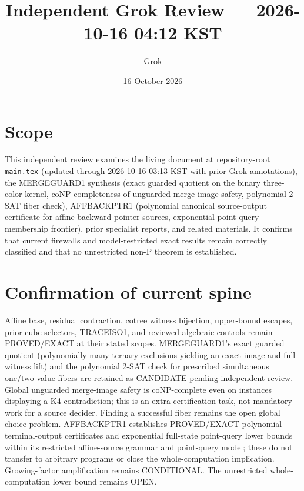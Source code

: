 \documentclass[11pt]{article}
\title{Independent Grok Review --- 2026-10-16 04:12 KST}
\author{Grok}
\date{16 October 2026}
\begin{document}
\maketitle

\begin{center}
\end{center}

\section{Scope}
This independent review examines the living document at repository-root \texttt{main.tex} (updated through 2026-10-16 03:13 KST with prior Grok annotations), the MERGEGUARD1 synthesis (exact guarded quotient on the binary three-color kernel, coNP-completeness of unguarded merge-image safety, polynomial 2-SAT fiber check), AFFBACKPTR1 (polynomial canonical source-output certificate for affine backward-pointer sources, exponential point-query membership frontier), prior specialist reports, and related materials. It confirms that current firewalls and model-restricted exact results remain correctly classified and that no unrestricted non-P theorem is established.

\section{Confirmation of current spine}
Affine base, residual contraction, cotree witness bijection, upper-bound escapes, prior cube selectors, TRACEISO1, and reviewed algebraic controls remain PROVED/EXACT at their stated scopes. MERGEGUARD1's exact guarded quotient (polynomially many ternary exclusions yielding an exact image and full witness lift) and the polynomial 2-SAT check for prescribed simultaneous one/two-value fibers are retained as CANDIDATE pending independent review. Global unguarded merge-image safety is coNP-complete even on instances displaying a K4 contradiction; this is an extra certification task, not mandatory work for a source decider. Finding a successful fiber remains the open global choice problem. AFFBACKPTR1 establishes PROVED/EXACT polynomial terminal-output certificates and exponential full-state point-query lower bounds within its restricted affine-source grammar and point-query model; these do not transfer to arbitrary programs or close the whole-computation implication. Growing-factor amplification remains CONDITIONAL. The unrestricted whole-computation lower bound remains OPEN.
\end{document}
